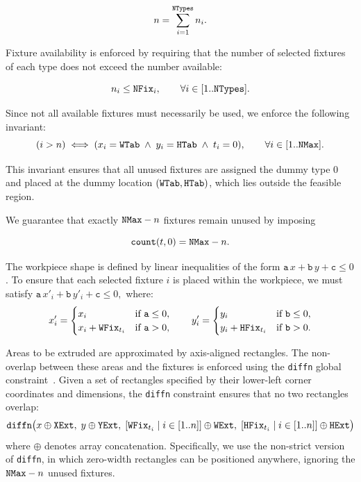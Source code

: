 \[
n = \sum_{i=1}^{\mathtt{NTypes}} n_i.
\]

Fixture availability is enforced by requiring that the number of selected fixtures of each type does not exceed the number available:

\[
n_i \leq \mathtt{NFix}_i, \qquad \forall i \in [1..\mathtt{NTypes}].
\]

Since not all available fixtures must necessarily be used, we enforce the following invariant:
\[
(i > n) \iff (x_i = \mathtt{WTab} \;\wedge\; y_i = \mathtt{HTab} \;\wedge\; t_i = 0), \qquad \forall i \in [1..\mathtt{NMax}].
\]

This invariant ensures that all unused fixtures are assigned the dummy type \(0\) and placed at the dummy location \((\mathtt{WTab},\mathtt{HTab})\), which lies outside the feasible region.

We guarantee that exactly \(\mathtt{NMax}-n\) fixtures remain unused by imposing

\[
\texttt{count}(t,0) = \mathtt{NMax} - n.
\]


The workpiece shape is defined by linear inequalities of the form \( \mathtt{a}\,x + \mathtt{b}\,y + \mathtt{c} \leq 0 \).
To ensure that each selected fixture \( i \) is placed within the workpiece, we must satisfy
\(
\mathtt{a}\,x'_i + \mathtt{b}\,y'_i + \mathtt{c} \leq 0,
\)
where:
\[
x'_i =
\begin{cases}
	x_i & \text{if } \mathtt{a} \leq 0,\\
	x_i + \mathtt{WFix}_{t_i} & \text{if } \mathtt{a} > 0,
\end{cases}
\qquad
y'_i =
\begin{cases}
	y_i & \text{if } \mathtt{b} \leq 0,\\
	y_i + \mathtt{HFix}_{t_i} & \text{if } \mathtt{b} > 0.
\end{cases}
\]

Areas to be extruded are approximated by axis-aligned rectangles. The non-overlap between these areas and the fixtures is enforced using the \texttt{diffn} global constraint~\cite{DBLP:journals/constraints/BeldiceanuCDP07}. Given a set of rectangles specified by their lower-left corner coordinates and dimensions, the \texttt{diffn} constraint ensures that no two rectangles overlap:
\[
\texttt{diffn}\big(
x \oplus \mathtt{XExt},\;
y \oplus \mathtt{YExt},\;
[\mathtt{WFix}_{t_i} \mid i \in [1..n]] \oplus \mathtt{WExt},\;
[\mathtt{HFix}_{t_i} \mid i \in [1..n]] \oplus \mathtt{HExt}
\big)
\]
where \( \oplus \) denotes array concatenation. Specifically, we use the non-strict version of \texttt{diffn}, in which zero-width rectangles can be positioned anywhere, ignoring the \( \mathtt{NMax} - n \) unused fixtures.

